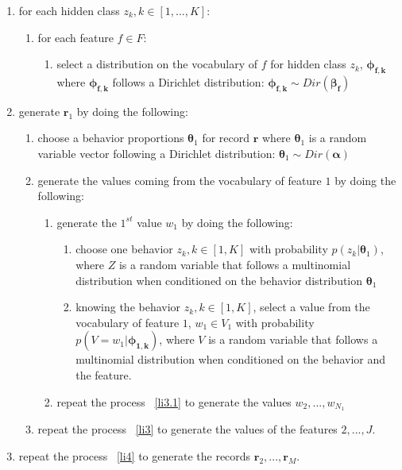 \begin{enumerate} 
	\item for each hidden class $z_{k}, k\in[1,...,K]$:
		\begin{enumerate}
		 	\item for each feature $f\in F$:
	 		 	\begin{enumerate}
		 			\item select a distribution on the vocabulary of $f$ for hidden class $z_{k}$, $\boldsymbol{\phi _{f,k}}$ where $\boldsymbol{\phi _{f,k}}$ follows a Dirichlet distribution: $\boldsymbol{\phi _{f,k}}\sim 								Dir(\boldsymbol{\beta _{f}})$ \label{li2} 
		 		\end{enumerate}
		\end{enumerate}
	\item generate $\mathbf{r}_{1}$ by doing the following: \label{li4}
		\begin{enumerate}
			\item choose a behavior proportions $\boldsymbol{\theta }_{1}$ for record $\mathbf{r}$ where $\boldsymbol{\theta }_{1}$ is a random variable vector following a Dirichlet distribution: $\boldsymbol{\theta }_{1}\sim 								Dir(\boldsymbol{\alpha })$ \label{li2} 
			\item generate the values coming from the vocabulary of feature $1$ by doing the following: \label{li3}
	 			\begin{enumerate}
		 			\item generate the $1^{st}$ value $w_1$ by doing the following: \label{li3.1}
	 		 			\begin{enumerate}
		 					\item choose one behavior $z_{k},k\in [1,K]$ with probability $p(z_{k}|\boldsymbol{\theta }_{1})$, where $Z$ is a random variable that follows a multinomial distribution when conditioned on the 									behavior distribution $\boldsymbol{\theta }_{1}$
		 					\item knowing the behavior $z_{k},k\in [1,K]$, select a value from the vocabulary of feature $1$, $w_{1} \in V_{1}$ with probability $p(V=w_{1}|\boldsymbol{\phi _{1,k}})$, where $V$ is a random 								variable that follows a multinomial distribution when conditioned on the behavior and the feature.
		 				\end{enumerate}
					\item repeat the process ~\ref{li3.1} to generate the values $w_{2},...,w_{N_{1}}$
				\end{enumerate} 
			\item repeat the process ~\ref{li3} to generate the values of the features $2,...,J$. 
		\end{enumerate}
	\item repeat the process ~\ref{li4} to generate the records $\mathbf{r}_{2},...,\mathbf{r}_{M}$. 
\end{enumerate} \par

